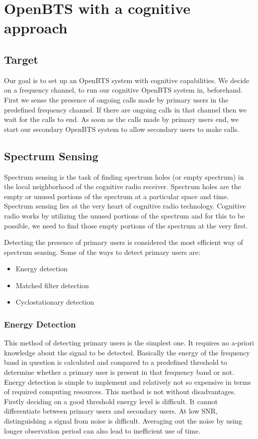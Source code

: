 \chapter{OpenBTS with a cognitive approach}


\section{Target}

Our goal is to set up an OpenBTS system with cognitive capabilities. We decide on a frequency channel, to run our cognitive OpenBTS system in, beforehand. First we sense the presence of ongoing calls made by primary users in the predefined frequency channel. If there are ongoing calls in that channel then we wait for the calls to end. As soon as the calls made by primary users end, we start our secondary OpenBTS system to allow secondary users to make calls.

\section{Spectrum Sensing}

Spectrum sensing is the task of finding spectrum holes (or empty spectrum) in the local neighborhood of the cognitive radio receiver. Spectrum holes are the empty or unused portions of the spectrum at a particular space and time. Spectrum sensing lies at the very heart of cognitive radio technology. Cognitive radio works by utilizing the unused portions of the spectrum and for this to be possible, we need to find those empty portions of the spectrum at the very first. 

Detecting the presence of primary users is considered the most efficient way of spectrum sensing. Some of the ways to detect primary users are:

\begin{itemize}
	\item Energy detection
	\item Matched filter detection
	\item Cyclostationary detection
\end{itemize}

\subsection{Energy Detection}

This method of detecting primary users is the simplest one. It requires no a-priori knowledge about the signal to be detected. Basically the energy of the frequency band in question is calculated and compared to a predefined threshold to determine whether a primary user is present in that frequency band or not. Energy detection is simple to implement and relatively not so expensive in terms of required computing resources.
This method is not without disadvantages. Firstly deciding on a good threshold energy level is difficult. It cannot differentiate between primary users and secondary users. At low SNR, distinguishing a signal from noise is difficult. Averaging out the noise by using longer observation period can also lead to inefficient use of time. 

